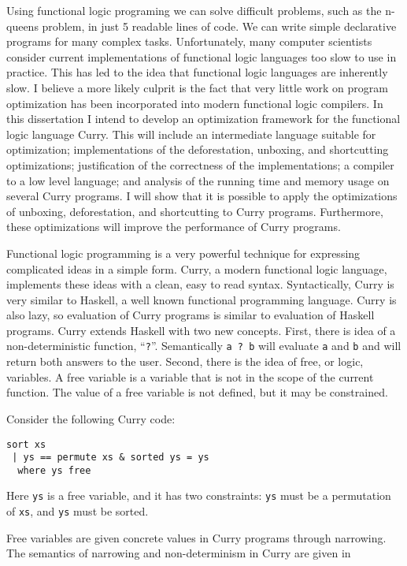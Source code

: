 
Using functional logic programing we can solve difficult problems, such as the n-queens problem, in
just 5 readable lines of code.
We can write simple declarative programs for many complex tasks.
Unfortunately, many computer scientists consider current implementations of functional logic languages
too slow to use in practice.
This has led to the idea that functional logic languages are inherently slow.
I believe a more likely culprit is the fact that very little work on program optimization 
has been incorporated into modern functional logic compilers.
In this dissertation I intend to develop an optimization framework for the functional logic language Curry.
This will include an intermediate language suitable for optimization;
implementations of the deforestation, unboxing, and shortcutting optimizations;
justification of the correctness of the implementations;
a compiler to a low level language;
and analysis of the running time and memory usage on several Curry programs.
I will show that it is possible to apply the optimizations of unboxing, deforestation, and shortcutting to Curry programs.
Furthermore, these optimizations will improve the performance of Curry programs.

Functional logic programming is a very powerful technique for expressing complicated ideas in a simple form.
Curry, a modern functional logic language, implements these ideas with a clean, easy to read syntax.
Syntactically, Curry is very similar to Haskell, a well known functional programming language.
Curry is also lazy, so evaluation of Curry programs is similar to evaluation of Haskell programs.
Curry extends Haskell with two new concepts.
First, there is idea of a non-deterministic function, ``\texttt{?}''.  
Semantically \texttt{a ? b} will evaluate \texttt{a} and \texttt{b} and will return both answers to the user.
Second, there is the idea of free, or logic, variables.
A free variable is a variable that is not in the scope of the current function.
The value of a free variable is not defined, but it may be constrained.

Consider the following Curry code:
\begin{verbatim}
sort xs
 | ys == permute xs & sorted ys = ys
  where ys free
\end{verbatim}
Here \texttt{ys} is a free variable, and it has two constraints:
\texttt{ys} must be a permutation of \texttt{xs}, and \texttt{ys} must be sorted.

Free variables are given concrete values in Curry programs through narrowing.
The semantics of narrowing and non-determinism in Curry are given in \cite{Antoy97ALP}

